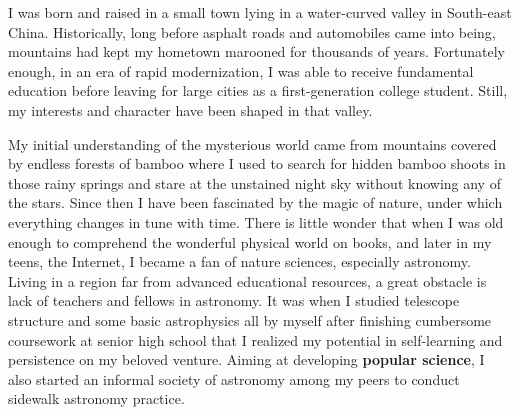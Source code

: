 \documentclass[11pt, a4paper]{awesome-cv} %
\begin{document}
\makecvheader %



\begin{cvletter}


I was born and raised in a small town lying in a water-curved valley in South-east China. Historically, long before asphalt roads and automobiles came into being, mountains had kept my hometown marooned for thousands of years. Fortunately enough, in an era of rapid modernization, I was able to receive fundamental education before leaving for large cities as a first-generation college student. Still, my interests and character have been shaped in that valley.

My initial understanding of the mysterious world came from mountains covered by endless forests of bamboo where I used to search for hidden bamboo shoots in those rainy springs and stare at the unstained night sky without knowing any of the stars. Since then I have been fascinated by the magic of nature, under which everything changes in tune with time. There is little wonder that when I was old enough to comprehend the wonderful physical world on books, and later in my teens, the Internet, I became a fan of nature sciences, especially astronomy. Living in a region far from advanced educational resources, a great obstacle is lack of teachers and fellows in astronomy. It was when I studied telescope structure and some basic astrophysics all by myself after finishing cumbersome coursework at senior high school that I realized my potential in self-learning and persistence on my beloved venture. Aiming at developing \textbf{popular science}, I also started an informal society of astronomy among my peers to conduct sidewalk astronomy practice.


\end{cvletter}
\end{document}
